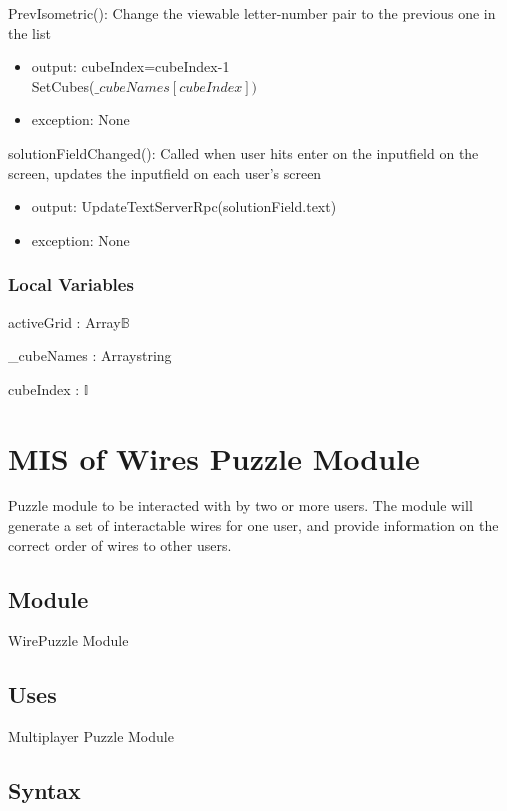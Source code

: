 \documentclass[12pt, titlepage]{article}
\begin{document}
PrevIsometric(): Change the viewable letter-number pair to the previous one in the list
\begin{itemize}
    \item output: cubeIndex=cubeIndex-1\\
    SetCubes($\_cubeNames[cubeIndex])$
    \item exception: None
\end{itemize}

solutionFieldChanged(): Called when user hits enter on the inputfield on the screen, updates the inputfield on each user's screen
\begin{itemize}
    \item output: UpdateTextServerRpc(solutionField.text)
    \item exception: None
\end{itemize}

\subsubsection{Local Variables}

activeGrid : Array\textlangle $\mathds{B}$\textrangle

\noindent \_cubeNames : Array\textlangle string\textrangle

\noindent cubeIndex : $\mathds{I}$

\newpage

\section{MIS of {Wires Puzzle Module}} \label{sec:WiresModule} 

Puzzle module to be interacted with by two or more users. The module will generate a set of interactable wires for one user, and provide information on the correct order of wires to other users.
 
\subsection{Module}
WirePuzzle Module

\subsection{Uses}
Multiplayer Puzzle Module

\subsection{Syntax}
\end{document}
